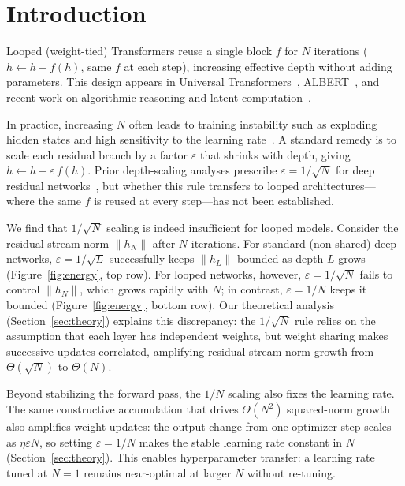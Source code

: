 \section{Introduction}

Looped (weight-tied) Transformers reuse a single block $f$ for $N$ iterations ($h \leftarrow h + f(h)$, same $f$ at each step), increasing effective depth without adding parameters.
This design appears in Universal Transformers~\citep{dehghani2018universal}, ALBERT~\citep{lan2019albert}, and recent work on algorithmic reasoning and latent computation~\citep{yang2023looped,fan2024looped,saunshi2025latent,gatmiry2024multistep,ng2024loopnn,zhu2025ouro}.



In practice, increasing $N$ often leads to training instability such as exploding hidden states and high sensitivity to the learning rate~\citep{zhu2025ouro}.
A standard remedy is to scale each residual branch by a factor $\varepsilon$ that shrinks with depth, giving $h \leftarrow h + \varepsilon\,f(h)$.
Prior depth-scaling analyses prescribe $\varepsilon = 1/\!\sqrt{N}$ for deep residual networks~\citep{bordelon2024depthwise,dey2025completep}, but whether this rule transfers to looped architectures---where the same $f$ is reused at every step---has not been established.

We find that $1/\!\sqrt{N}$ scaling is indeed insufficient for looped models.
Consider the residual-stream norm $\|h_N\|$ after $N$ iterations.
For standard (non-shared) deep networks, $\varepsilon = 1/\!\sqrt{L}$ successfully keeps $\|h_L\|$ bounded as depth $L$ grows (Figure~\ref{fig:energy}, top row).
For looped networks, however, $\varepsilon = 1/\!\sqrt{N}$ fails to control $\|h_N\|$, which grows rapidly with $N$; in contrast, $\varepsilon = 1/N$ keeps it bounded (Figure~\ref{fig:energy}, bottom row).
Our theoretical analysis (Section~\ref{sec:theory}) explains this discrepancy: the $1/\!\sqrt{N}$ rule relies on the assumption that each layer has independent weights, but weight sharing makes successive updates correlated, amplifying residual-stream norm growth from $\Theta(\!\sqrt{N})$ to $\Theta(N)$.



Beyond stabilizing the forward pass, the $1/N$ scaling also fixes the learning rate.
The same constructive accumulation that drives $\Theta(N^2)$ squared-norm growth also amplifies weight updates: the output change from one optimizer step scales as $\eta\varepsilon N$, so setting $\varepsilon=1/N$ makes the stable learning rate constant in $N$ (Section~\ref{sec:theory}).
This enables hyperparameter transfer: a learning rate tuned at $N{=}1$ remains near-optimal at larger $N$ without re-tuning.

